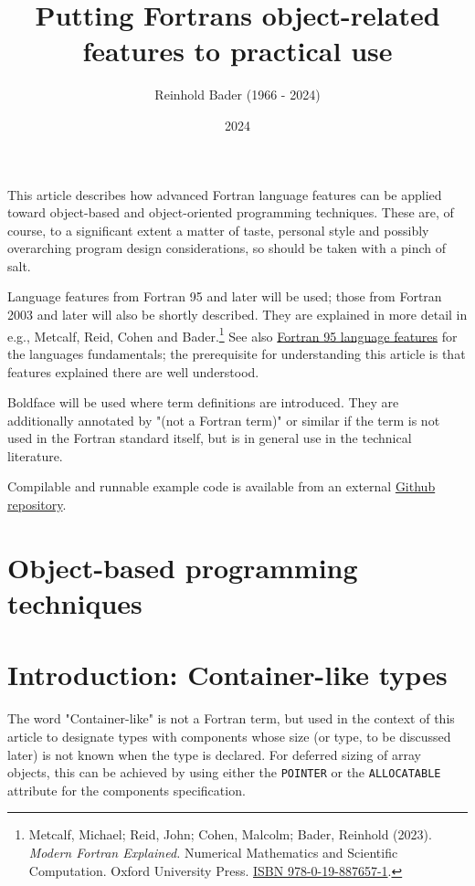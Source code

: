 \documentclass[]{scrartcl}
\title{Putting Fortran\textquotesingle s object-related features to
practical use}
\author{Reinhold Bader (1966 - 2024)}
\date{2024}
\begin{document}
\maketitle

This article describes how advanced Fortran language features can be
applied toward object-based and object-oriented programming techniques.
These are, of course, to a significant extent a matter of taste,
personal style and possibly overarching program design considerations,
so should be taken with a pinch of salt.

Language features from Fortran 95 and later will be used; those from
Fortran 2003 and later will also be shortly described. They are
explained in more detail in e.g., Metcalf, Reid, Cohen and
Bader.\footnote{Metcalf, Michael; Reid, John; Cohen, Malcolm; Bader,
  Reinhold (2023). \emph{Modern Fortran Explained.} Numerical
  Mathematics and Scientific Computation. Oxford University Press.
  \href{https://en.wikipedia.org/wiki/Special:BookSources/978-0-19-887657-1}{ISBN
  978-0-19-887657-1}.} See also
\href{https://en.wikipedia.org/wiki/Fortran_95_language_features}{Fortran
95 language features} for the language\textquotesingle s fundamentals;
the prerequisite for understanding this article is that features
explained there are well understood.

Boldface will be used where term definitions are introduced. They are
additionally annotated by "(not a Fortran term)" or similar if the term
is not used in the Fortran standard itself, but is in general use in the
technical literature.

Compilable and runnable example code is available from an external
\href{https://github.com/reinh-bader/object_fortran}{Github repository}.

\section{Object-based programming
techniques}\label{object-based-programming-techniques}

\section{Introduction: Container-like
types}\label{introduction-container-like-types}

The word "Container-like" is not a Fortran term, but used in the context
of this article to designate types with components whose size (or type,
to be discussed later) is not known when the type is declared. For
deferred sizing of array objects, this can be achieved by using either
the \texttt{POINTER} or the \texttt{ALLOCATABLE} attribute for the
component\textquotesingle s specification.
\end{document}
